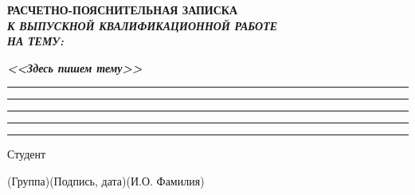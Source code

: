 \documentclass[14pt, russian]{scrartcl}
\begin{document}
\sloppy

\def\figurename{Рисунок}

\begin{titlepage}
\thispagestyle{empty}
\newpage

\bmstuheader
 
 
\vspace{3em}
 
\begin{center}
\Large \bf{РАСЧЕТНО-ПОЯСНИТЕЛЬНАЯ ЗАПИСКА\\\textbf{\textit{К ВЫПУСКНОЙ КВАЛИФИКАЦИОННОЙ РАБОТЕ\\НА ТЕМУ:}} \\}
\end{center}

\vspace*{-6ex} 
\begin{center}
\Large{\textit{\textbf{<<Здесь пишем тему>>}}}

\vspace*{-3ex}
\rule{1\textwidth}{1.2pt}

\vspace*{-0.2ex}
\rule{1\textwidth}{1.2pt}

\vspace*{-0.2ex}
\rule{1\textwidth}{1.2pt}

\vspace*{-0.2ex}
\rule{1\textwidth}{1.2pt}

\vspace*{-0.2ex}
\rule{1\textwidth}{1.2pt}
\end{center}
 
\vspace{\fill}
 

\newlength{\ML}

\noindent Студент \underline{\hspace{1.5cm}} \hfill \underline{\hspace{4cm}}\quad
\underline{\hspace{4cm}}

\vspace{-2.1ex}
\noindent\hspace{9ex}\scriptsize{(Группа)}\normalsize\hspace{170pt}\hspace{2ex}\scriptsize{(Подпись, дата)}\normalsize\hspace{30pt}\hspace{6ex}\scriptsize{(И.О. Фамилия)}\normalsize


\end{titlepage}
\end{document}
